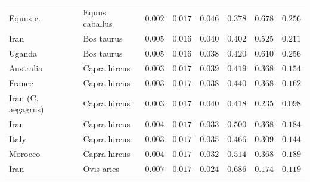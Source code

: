 \documentclass{article}
\begin{document}
\begin{center}
\begin{longtable*}{|l|l|r|r|r|r|r|r|}
            \bottomrule
            \endlastfoot
            Equus c. &      Equus caballus &               $ 0.002$ &          $ 0.017$ &                   $ 0.046$ &                                          $ 0.378$ &                         $ 0.678$ &                      $ 0.256$ \\
            Iran &          Bos taurus &               $ 0.005$ &          $ 0.016$ &                   $ 0.040$ &                                          $ 0.402$ &                         $ 0.525$ &                      $ 0.211$ \\
            Uganda &          Bos taurus &               $ 0.005$ &          $ 0.016$ &                   $ 0.038$ &                                          $ 0.420$ &                         $ 0.610$ &                      $ 0.256$ \\
            Australia &        Capra hircus &               $ 0.003$ &          $ 0.017$ &                   $ 0.039$ &                                          $ 0.419$ &                         $ 0.368$ &                      $ 0.154$ \\
            France &        Capra hircus &               $ 0.003$ &          $ 0.017$ &                   $ 0.038$ &                                          $ 0.440$ &                         $ 0.368$ &                      $ 0.162$ \\
            Iran (C. aegagrus) &        Capra hircus &               $ 0.003$ &          $ 0.017$ &                   $ 0.040$ &                                          $ 0.418$ &                         $ 0.235$ &                      $ 0.098$ \\
            Iran &        Capra hircus &               $ 0.004$ &          $ 0.017$ &                   $ 0.033$ &                                          $ 0.500$ &                         $ 0.368$ &                      $ 0.184$ \\
            Italy &        Capra hircus &               $ 0.003$ &          $ 0.017$ &                   $ 0.035$ &                                          $ 0.466$ &                         $ 0.309$ &                      $ 0.144$ \\
            Morocco &        Capra hircus &               $ 0.004$ &          $ 0.017$ &                   $ 0.032$ &                                          $ 0.514$ &                         $ 0.368$ &                      $ 0.189$ \\
            Iran &          Ovis aries &               $ 0.007$ &          $ 0.017$ &                   $ 0.024$ &                                          $ 0.686$ &                         $ 0.174$ &                      $ 0.119$ \\

\end{longtable*}
\end{center}
\end{document}
